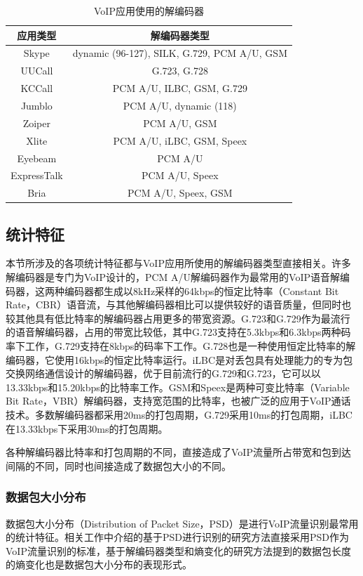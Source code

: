 \begin{table}[htbp]
  \caption{VoIP应用使用的解编码器}
  \label{tab:codecs}
  \centering
  \begin{tabular}{c c}
    \hline
    \textbf{应用类型} & \textbf{解编码器类型}\\
    \hline
    Skype      & dynamic (96-127), SILK, G.729, PCM A/U, GSM  \\
    UUCall      & G.723, G.728  \\
    KCCall      & PCM A/U, ILBC, GSM, G.729  \\
    Jumblo      & PCM A/U, dynamic (118)  \\
    Zoiper      & PCM A/U, GSM  \\
    Xlite      &  PCM A/U, iLBC, GSM, Speex \\
    Eyebeam      & PCM A/U  \\
    ExpressTalk      & PCM A/U, Speex  \\
    Bria      & PCM A/U, Speex, GSM  \\
    \hline
  \end{tabular}
\end{table}



\subsection{统计特征}
\label{sec:statisticalfeatures}
本节所涉及的各项统计特征都与VoIP应用所使用的解编码器类型直接相关。许多解编码器是专门为VoIP设计的，PCM A/U解编码器作为最常用的VoIP语音解编码器，这两种编码器都生成以8kHz采样的64kbps的恒定比特率（Constant Bit Rate，CBR）语音流，与其他解编码器相比可以提供较好的语音质量，但同时也较其他具有低比特率的解编码器占用更多的带宽资源。G.723和G.729作为最流行的语音解编码器，占用的带宽比较低，其中G.723支持在5.3kbps和6.3kbps两种码率下工作，G.729支持在8kbps的码率下工作。G.728也是一种使用恒定比特率的解编码器，它使用16kbps的恒定比特率运行。iLBC是对丢包具有处理能力的专为包交换网络通信设计的解编码器，优于目前流行的G.729和G.723，它可以以13.33kbps和15.20kbps的比特率工作。GSM和Speex是两种可变比特率（Variable Bit Rate，VBR）解编码器，支持宽范围的比特率，也被广泛的应用于VoIP通话技术。多数解编码器都采用20ms的打包周期，G.729采用10ms的打包周期，iLBC在13.33kbps下采用30ms的打包周期。

各种解编码器比特率和打包周期的不同，直接造成了VoIP流量所占带宽和包到达间隔的不同，同时也间接造成了数据包大小的不同。

\subsubsection{数据包大小分布}
数据包大小分布（Distribution of Packet Size，PSD）是进行VoIP流量识别最常用的统计特征。相关工作中介绍的基于PSD进行识别的研究方法直接采用PSD作为VoIP流量识别的标准\supercite{22}，基于解编码器类型和熵变化的研究方法提到的数据包长度的熵变化也是数据包大小分布的表现形式\supercite{4}。

